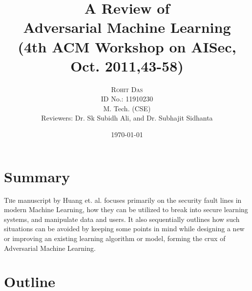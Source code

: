 \documentclass[twoside,twocolumn]{article}
\title{A Review of\\ Adversarial Machine Learning\\ 
\huge{(4th ACM Workshop on AISec, Oct. 2011,43-58)}} %
\author{%
\Large \textsc{Rohit Das}\\ %
\large ID No.: 11910230\\
\large M. Tech. (CSE)\\
Reviewers: Dr. Sk Subidh Ali, and Dr. Subhajit Sidhanta
}
\date{\today} %
\begin{document}
\maketitle


\section{Summary}

\lettrine[nindent=0em,lines=3]{T} he manuscript by Huang et. al. focuses primarily on the security fault lines in modern Machine Learning, how they can be utilized to break into secure learning systems, and manipulate data and users. It also sequentially outlines how such situations can be avoided by keeping some points in mind while designing a new or improving an existing learning algorithm or model, forming the crux of Adversarial Machine Learning.



\section{Outline}
\end{document}
